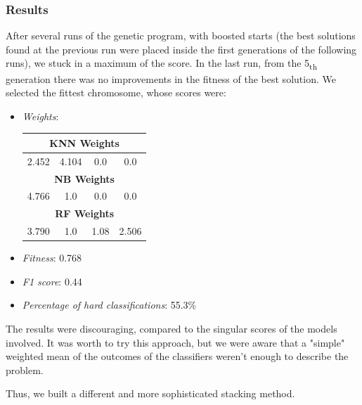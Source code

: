 \subsubsection{Results}
After several runs of the genetic program, with boosted starts (the best solutions found at the previous run were placed inside the first generations of the following runs), we stuck in a maximum of the score.
In the last run, from the 5\textsubscript{th} generation there was no improvements in the fitness of the best solution. We selected the fittest chromosome, whose scores were:
\begin{itemize}
	\item[\PencilRight] \textit{Weights}:
	
	\begin{center}
		\begin{tabular}{@{}c|c|c|c@{}}
			\hline\hline
			\multicolumn{4}{c}{\textbf{KNN Weights}}\\
			\hline
			\multicolumn{1}{c|}{2.452}&
			\multicolumn{1}{c|}{4.104}&
			\multicolumn{1}{c|}{0.0}&
			\multicolumn{1}{c}{0.0}\\
			\hline
			\multicolumn{4}{c}{\textbf{NB Weights}}\\
			\hline
			\multicolumn{1}{c|}{4.766}&
			\multicolumn{1}{c|}{1.0}&
			\multicolumn{1}{c|}{0.0}&
			\multicolumn{1}{c}{0.0}\\
			\hline
			\multicolumn{4}{c}{\textbf{RF Weights}}\\
			\hline
			\multicolumn{1}{c|}{3.790}&
			\multicolumn{1}{c|}{1.0}&
			\multicolumn{1}{c|}{1.08}&
			\multicolumn{1}{c}{2.506}\\
			\hline\hline
		\end{tabular}
	\end{center}
	\item[\PencilRight] \textit{Fitness}: 0.768
	\item[\PencilRight] \textit{F1 score}: 0.44
	\item[\PencilRight] \textit{Percentage of hard classifications}: 55.3\%
\end{itemize}

The results were discouraging, compared to the singular scores of the models involved.
It was worth to try this approach, but we were aware that a "simple" weighted mean of the outcomes of the classifiers weren't enough to describe the problem.

Thus, we built a different and more sophisticated stacking method.

